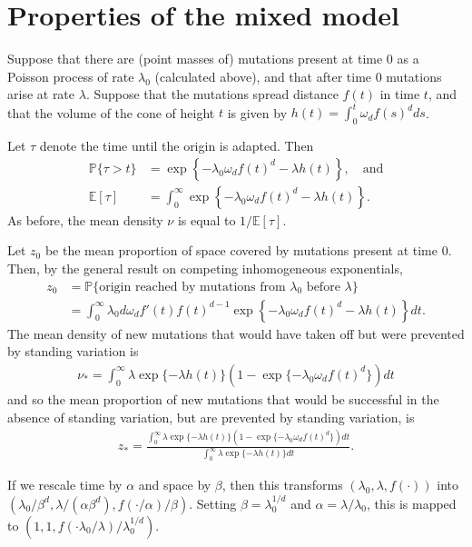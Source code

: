 \documentclass{article}
\renewcommand{\P}{\mathbb{P}}
\newcommand{\E}{\mathbb{E}}
\begin{document}
\section{Properties of the mixed model}

Suppose that there are (point masses of) mutations present at time 0 as a Poisson process of rate $\lambda_0$ (calculated above),
and that after time 0 mutations arise at rate $\lambda$.
Suppose that the mutations spread distance $f(t)$ in time $t$, 
and that the volume of the cone of height $t$ is given by $h(t) = \int_0^t \omega_d f(s)^d ds$.

Let $\tau$ denote the time until the origin is adapted.
Then
\begin{align}
   \P \{ \tau > t \} &= \exp \left\{ - \lambda_0 \omega_d f(t)^d - \lambda h(t) \right\}, \quad \mbox{and} \\
   \E [ \tau ] &= \int_0^\infty \exp \left\{ - \lambda_0 \omega_d f(t)^d - \lambda h(t) \right\} .
\end{align}
As before, the mean density $\nu$ is equal to $1/\E[\tau]$.

Let $z_0$ be the mean proportion of space covered by mutations present at time 0.
Then, by the general result on competing inhomogeneous exponentials,
\begin{align}
    z_0 &= \P\{ \mbox{origin reached by mutations from $\lambda_0$ before $\lambda$} \} \\
        &= \int_0^\infty \lambda_0 d \omega_d f'(t) f(t)^{d-1} \exp \left\{ - \lambda_0 \omega_d f(t)^d - \lambda h(t) \right\} dt .
\end{align}
The mean density of new mutations that would have taken off but were prevented by standing variation is
\begin{align}
    \nu_* = \int_0^\infty \lambda \exp\{ - \lambda h(t) \} \left( 1 - \exp\{ -\lambda_0 \omega_d f(t)^d \} \right) dt
\end{align}
and so the mean proportion of new mutations that would be successful in the absence of standing variation, but are prevented by standing variation,
is 
\begin{align}
    z_* = \frac{ \int_0^\infty \lambda \exp\{ - \lambda h(t) \} \left( 1 - \exp\{ -\lambda_0 \omega_d f(t)^d \} \right) dt }
                { \int_0^\infty \lambda \exp\{ - \lambda h(t) \} dt } .
\end{align}

If we rescale time by $\alpha$ and space by $\beta$, 
then this transforms $(\lambda_0, \lambda, f(\cdot))$ into $(\lambda_0/\beta^d, \lambda/(\alpha \beta^d), f(\cdot/\alpha)/\beta)$.  
Setting $\beta = \lambda_0^{1/d}$ and $\alpha = \lambda / \lambda_0$, this is mapped to $(1,1,f(\cdot \lambda_0/\lambda)/\lambda_0^{1/d})$.
\end{document}
